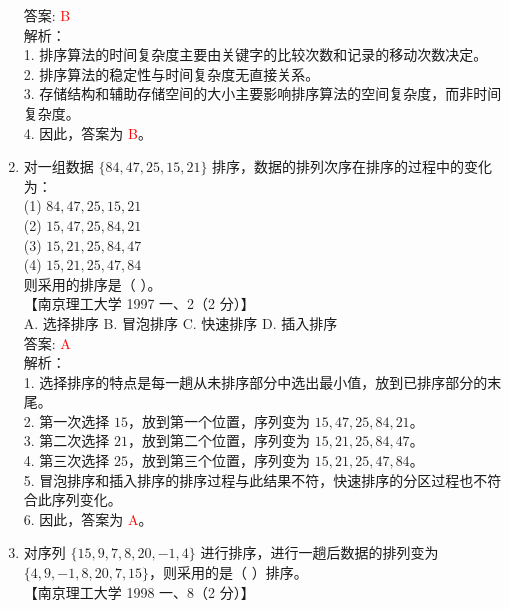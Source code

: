 \documentclass[lang=cn,newtx,10pt,scheme=chinese]{../../../elegantbook}
\begin{document}
\begin{enumerate}
    答案: \textcolor{red}{B} \\

    解析：\\
    1. 排序算法的时间复杂度主要由关键字的比较次数和记录的移动次数决定。\\
    2. 排序算法的稳定性与时间复杂度无直接关系。\\
    3. 存储结构和辅助存储空间的大小主要影响排序算法的空间复杂度，而非时间复杂度。\\
    4. 因此，答案为 \textcolor{red}{B}。\\

    \item 对一组数据 $\{84, 47, 25, 15, 21\}$ 排序，数据的排列次序在排序的过程中的变化为：\\
    
    (1) $84, 47, 25, 15, 21$ \\  
    (2) $15, 47, 25, 84, 21$ \\  
    (3) $15, 21, 25, 84, 47$ \\  
    (4) $15, 21, 25, 47, 84$ \\  

    则采用的排序是（ ）。\\
    【南京理工大学 1997 一、2（2 分）】\\  

    A. 选择排序 \quad B. 冒泡排序 \quad C. 快速排序 \quad D. 插入排序 \\

    答案: \textcolor{red}{A} \\

    解析：\\
    1. 选择排序的特点是每一趟从未排序部分中选出最小值，放到已排序部分的末尾。\\
    2. 第一次选择 $15$，放到第一个位置，序列变为 $15, 47, 25, 84, 21$。\\
    3. 第二次选择 $21$，放到第二个位置，序列变为 $15, 21, 25, 84, 47$。\\
    4. 第三次选择 $25$，放到第三个位置，序列变为 $15, 21, 25, 47, 84$。\\
    5. 冒泡排序和插入排序的排序过程与此结果不符，快速排序的分区过程也不符合此序列变化。\\
    6. 因此，答案为 \textcolor{red}{A}。\\

    \item 对序列 $\{15, 9, 7, 8, 20, -1, 4\}$ 进行排序，进行一趟后数据的排列变为 $\{4, 9, -1, 8, 20, 7, 15\}$，则采用的是（ ）排序。\\
    【南京理工大学 1998 一、8（2 分）】\\  


\end{enumerate}
\end{document}
